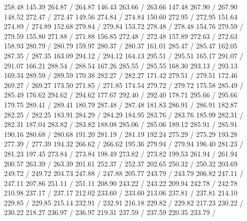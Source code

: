 { 258.48 145.39 264.87 /
 264.87 146.43 263.66 /
 263.66 147.48 267.90 /
 267.90 148.52 272.47 /
 272.47 149.56 274.84 /
 274.84 150.60 272.95 /
 272.95 151.64 274.89 /
 274.89 152.68 279.84 /
 279.84 153.72 278.48 /
 278.48 154.76 279.59 /
 279.59 155.80 271.88 /
 271.88 156.85 272.48 /
 272.48 157.89 272.63 /
 272.63 158.93 280.79 /
 280.79 159.97 280.37 /
 280.37 161.01 285.47 /
 285.47 162.05 287.35 /
 287.35 163.09 294.12 /
 294.12 164.13 295.51 /
 295.51 165.17 291.07 /
 291.07 166.21 288.54 /
 288.54 167.26 285.55 /
 285.55 168.30 293.13 /
 293.13 169.34 289.59 /
 289.59 170.38 282.27 /
 282.27 171.42 279.51 /
 279.51 172.46 269.27 /
 269.27 173.50 271.85 /
 271.85 174.54 279.72 /
 279.72 175.58 285.49 /
 285.49 176.62 294.62 /
 294.62 177.67 292.40 /
 292.40 178.71 295.66 /
 295.66 179.75 289.41 /
 289.41 180.79 287.48 /
 287.48 181.83 286.91 /
 286.91 182.87 282.25 /
 282.25 183.91 284.29 /
 284.29 184.95 283.76 /
 283.76 185.99 282.31 /
 282.31 187.04 283.82 /
 283.82 188.08 285.06 /
 285.06 189.12 285.91 /
 285.91 190.16 280.68 /
 280.68 191.20 281.19 /
 281.19 192.24 275.29 /
 275.29 193.28 277.39 /
 277.39 194.32 266.62 /
 266.62 195.36 279.94 /
 279.94 196.40 281.23 /
 281.23 197.45 273.84 /
 273.84 198.49 273.82 /
 273.82 199.53 261.94 /
 261.94 200.57 263.39 /
 263.39 201.61 252.37 /
 252.37 202.65 250.32 /
 250.32 203.69 249.72 /
 249.72 204.73 247.88 /
 247.88 205.77 243.79 /
 243.79 206.82 247.11 /
 247.11 207.86 251.11 /
 251.11 208.90 243.22 /
 243.22 209.94 242.78 /
 242.78 210.98 237.17 /
 237.17 212.02 233.60 /
 233.60 213.06 237.81 /
 237.81 214.10 229.85 /
 229.85 215.14 232.91 /
 232.91 216.18 229.82 /
 229.82 217.23 230.22 /
 230.22 218.27 236.97 /
 236.97 219.31 237.59 /
 237.59 220.35 233.79 /
}
